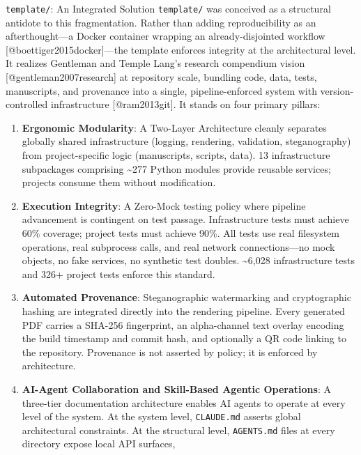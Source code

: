 \documentclass[
  ignorenonframetext,
]{beamer}
\begin{document}
\begin{frame}[fragile]{\texttt{template/}: An Integrated Solution}
\protect{}\label{template-an-integrated-solution}
\texttt{template/} was conceived as a structural antidote to this
fragmentation. Rather than adding reproducibility as an afterthought---a
Docker container wrapping an already-disjointed workflow
{[}@boettiger2015docker{]}---the template enforces integrity at the
architectural level. It realizes Gentleman and Temple Lang's research
compendium vision {[}@gentleman2007research{]} at repository scale,
bundling code, data, tests, manuscripts, and provenance into a single,
pipeline-enforced system with version-controlled infrastructure
{[}@ram2013git{]}. It stands on four primary pillars:

\begin{enumerate}
\item
  \textbf{Ergonomic Modularity}: A Two-Layer Architecture cleanly
  separates globally shared infrastructure (logging, rendering,
  validation, steganography) from project-specific logic (manuscripts,
  scripts, data). 13 infrastructure subpackages comprising
  \textasciitilde277 Python modules provide reusable services; projects
  consume them without modification.
\item
  \textbf{Execution Integrity}: A Zero-Mock testing policy where
  pipeline advancement is contingent on test passage. Infrastructure
  tests must achieve 60\% coverage; project tests must achieve 90\%. All
  tests use real filesystem operations, real subprocess calls, and real
  network connections---no mock objects, no fake services, no synthetic
  test doubles. \textasciitilde6,028 infrastructure tests and 326+
  project tests enforce this standard.
\item
  \textbf{Automated Provenance}: Steganographic watermarking and
  cryptographic hashing are integrated directly into the rendering
  pipeline. Every generated PDF carries a SHA-256 fingerprint, an
  alpha-channel text overlay encoding the build timestamp and commit
  hash, and optionally a QR code linking to the repository. Provenance
  is not asserted by policy; it is enforced by architecture.
\item
  \textbf{AI-Agent Collaboration and Skill-Based Agentic Operations}: A
  three-tier documentation architecture enables AI agents to operate at
  every level of the system. At the system level, \texttt{CLAUDE.md}
  asserts global architectural constraints. At the structural level,
  \texttt{AGENTS.md} files at every directory expose local API surfaces,

\end{enumerate}
\end{frame}
\end{document}
